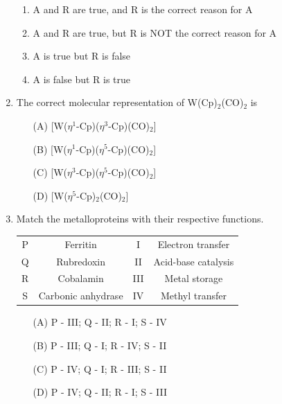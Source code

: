 \documentclass[journal,12pt,onecolumn]{IEEEtran}
\theoremstyle{remark}
\begin{document}
\begin{enumerate}
\begin{multicols}{1}
\begin{enumerate}
\item A and R are true, and R is the correct reason for A
\item A and R are true, but R is NOT the correct reason for A
\item A is true but R is false
\item A is false but R is true
\end{enumerate}
\end{multicols}








\item The correct molecular representation of W(Cp)$_2$(CO)$_2$ is \hfill{}

\begin{enumerate}
\item [(A)] [W($\eta^1$-Cp)($\eta^3$-Cp)(CO)$_2$]
\item [(B)] [W($\eta^1$-Cp)($\eta^5$-Cp)(CO)$_2$]
\item [(C)] [W($\eta^3$-Cp)($\eta^5$-Cp)(CO)$_2$]
\item [(D)] [W($\eta^5$-Cp)$_2$(CO)$_2$]
\end{enumerate}




\item Match the metalloproteins with their respective functions. \hfill{}

\begin{center}
\begin{tabular}{|c|c|c|c|}
\hline
P & Ferritin & I & Electron transfer \\
Q & Rubredoxin & II & Acid-base catalysis \\
R & Cobalamin & III & Metal storage \\
S & Carbonic anhydrase & IV & Methyl transfer \\
\hline
\end{tabular}
\end{center}

\begin{multicols}{2}
\begin{enumerate}
\item [(A)] P - III; Q - II; R - I; S - IV
\item [(B)] P - III; Q - I; R - IV; S - II
\item [(C)] P - IV; Q - I; R - III; S - II
\item [(D)] P - IV; Q - II; R - I; S - III
\end{enumerate}
\end{multicols}


\end{enumerate}
\end{document}
